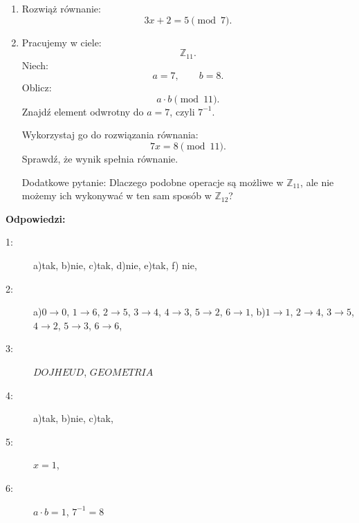 \documentclass{article}
\begin{document}
\begin{enumerate}
    \item Rozwiąż równanie:
    $$3x+2=5\pmod 7.$$

    \item Pracujemy w ciele:
    $$\mathbb Z_{11}.$$
    Niech:
    $$ a=7,\qquad b=8. $$
    Oblicz:
    $$ a\cdot b\pmod{11}. $$
    Znajdź element odwrotny do \(a=7\), czyli \(7^{-1}\).

    Wykorzystaj go do rozwiązania równania:
    $$ 7x=8\pmod{11}. $$
    Sprawdź, że wynik spełnia równanie.

    Dodatkowe pytanie:
    Dlaczego podobne operacje są możliwe w \(\mathbb Z_{11}\), ale nie możemy ich wykonywać w ten sam sposób w \(\mathbb Z_{12}\)?
\end{enumerate}

\newpage
\textbf{Odpowiedzi:}
\begin{description}
    \item [1:] a)tak, b)nie, c)tak, d)nie, e)tak, f) nie,
    \item [2:] a)$0 \rightarrow 0$, $1 \rightarrow 6$, $2 \rightarrow 5$, $3 \rightarrow 4$, $4 \rightarrow 3$, $5 \rightarrow 2$, $6 \rightarrow 1$,
    b)$1 \rightarrow 1$, $2 \rightarrow 4$, $3 \rightarrow 5$, $4 \rightarrow 2$, $5 \rightarrow 3$, $6 \rightarrow 6$,
    \item [3:] $DOJHEUD$, $GEOMETRIA$
    \item [4:] a)tak, b)nie, c)tak,
    \item [5:] $x=1$,
    \item [6:] $a\cdot b=1$, $7^{-1} = 8$
\end{description}
\end{document}
